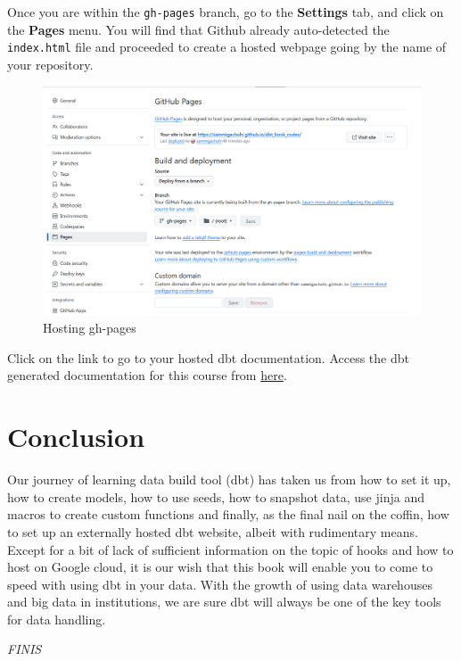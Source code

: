 \documentclass[
]{book}
\begin{document}
Once you are within the \texttt{gh-pages} branch, go to the \textbf{Settings} tab, and click on the \textbf{Pages} menu. You will find that Github already auto-detected the \texttt{index.html} file and proceeded to create a hosted webpage going by the name of your repository.

\begin{figure}
\centering
\includegraphics{./images/gh-pages-hosting.png}
\caption{Hosting gh-pages}
\end{figure}

Click on the link to go to your hosted dbt documentation. Access the dbt generated documentation for this course from \href{https://sammigachuhi.github.io/dbt_book_codes/\#!/overview}{here}.

\hypertarget{conclusion}{%
\chapter{Conclusion}\label{conclusion}}

Our journey of learning data build tool (dbt) has taken us from how to set it up, how to create models, how to use seeds, how to snapshot data, use jinja and macros to create custom functions and finally, as the final nail on the coffin, how to set up an externally hosted dbt website, albeit with rudimentary means. Except for a bit of lack of sufficient information on the topic of hooks and how to host on Google cloud, it is our wish that this book will enable you to come to speed with using dbt in your data. With the growth of using data warehouses and big data in institutions, we are sure dbt will always be one of the key tools for data handling.

\emph{FINIS}

  
\end{document}
